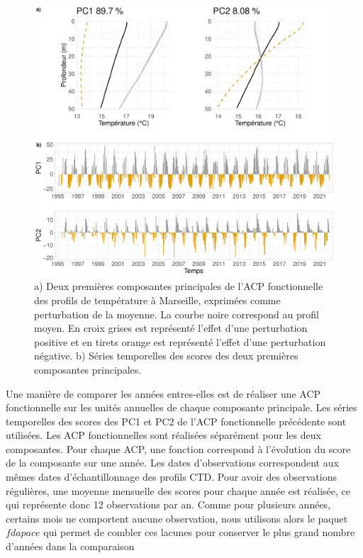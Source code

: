 \documentclass[12pt]{article}
\begin{document}
\begin{figure}
\centering
\includegraphics[width=.9\textwidth]{fig/R132_mean_pert_CTD.pdf}
\caption{a) Deux premières composantes principales de l'ACP fonctionnelle des profils de température à Marseille, exprimées comme perturbation de la moyenne. La courbe noire correspond au profil moyen. En croix grises est représenté l’effet d’une perturbation positive et en tirets orange est représenté l’effet d’une perturbation négative. b) Séries temporelles des scores des deux premières composantes principales.
}
\label{acp_ctd}
\end{figure}

Une manière de comparer les années entres-elles est de réaliser une ACP fonctionnelle sur les unités annuelles de chaque composante principale. Les séries temporelles des scores des PC1 et PC2 de l’ACP fonctionnelle précédente sont utilisées. Les ACP fonctionnelles sont réalisées séparément pour les deux composantes. Pour chaque ACP, une fonction correspond à l’évolution du score de la composante sur une année. Les dates d’observations correspondent aux mêmes dates d’échantillonnage des profils CTD. Pour avoir des observations régulières, une moyenne mensuelle des scores pour chaque année est réalisée, ce qui représente donc 12 observations par an. Comme pour plusieurs années, certains mois ne comportent aucune observation, nous utilisons alors le paquet $fdapace$ qui permet de combler ces lacunes pour conserver le plus grand nombre d’années dans la comparaison
\end{document}
